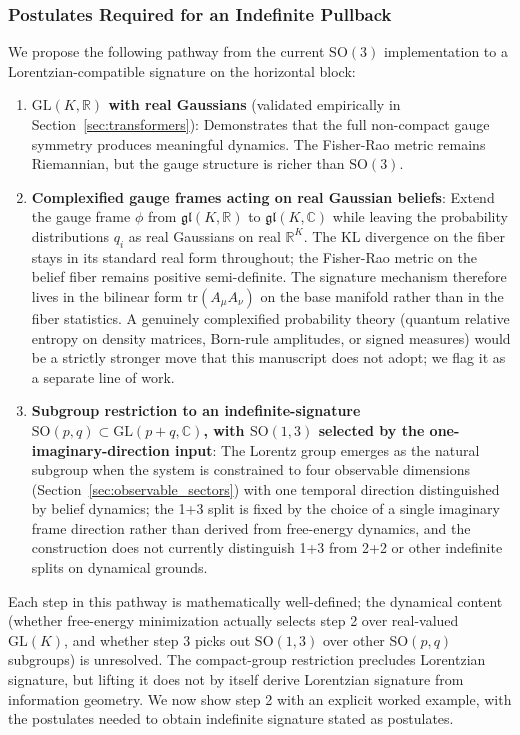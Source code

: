 \documentclass[11pt]{article}
\begin{document}
\subsubsection{Postulates Required for an Indefinite Pullback}

We propose the following pathway from the current $\mathrm{SO}(3)$ implementation to a Lorentzian-compatible signature on the horizontal block:

\begin{enumerate}
\item \textbf{$\mathrm{GL}(K, \mathbb{R})$ with real Gaussians} (validated empirically in Section~\ref{sec:transformers}): Demonstrates that the full non-compact gauge symmetry produces meaningful dynamics. The Fisher-Rao metric remains Riemannian, but the gauge structure is richer than $\mathrm{SO}(3)$.

\item \textbf{Complexified gauge frames acting on real Gaussian beliefs}: Extend the gauge frame $\phi$ from $\mathfrak{gl}(K, \mathbb{R})$ to $\mathfrak{gl}(K, \mathbb{C})$ while leaving the probability distributions $q_i$ as real Gaussians on real $\mathbb{R}^K$. The KL divergence on the fiber stays in its standard real form throughout; the Fisher-Rao metric on the belief fiber remains positive semi-definite. The signature mechanism therefore lives in the bilinear form $\mathrm{tr}(A_\mu A_\nu)$ on the base manifold rather than in the fiber statistics. A genuinely complexified probability theory (quantum relative entropy on density matrices, Born-rule amplitudes, or signed measures) would be a strictly stronger move that this manuscript does not adopt; we flag it as a separate line of work.

\item \textbf{Subgroup restriction to an indefinite-signature $\mathrm{SO}(p,q) \subset \mathrm{GL}(p{+}q, \mathbb{C})$, with $\mathrm{SO}(1,3)$ selected by the one-imaginary-direction input}: The Lorentz group emerges as the natural subgroup when the system is constrained to four observable dimensions (Section~\ref{sec:observable_sectors}) with one temporal direction distinguished by belief dynamics; the 1+3 split is fixed by the choice of a single imaginary frame direction rather than derived from free-energy dynamics, and the construction does not currently distinguish 1+3 from 2+2 or other indefinite splits on dynamical grounds.
\end{enumerate}

Each step in this pathway is mathematically well-defined; the dynamical content (whether free-energy minimization actually selects step 2 over real-valued $\mathrm{GL}(K)$, and whether step 3 picks out $\mathrm{SO}(1,3)$ over other $\mathrm{SO}(p,q)$ subgroups) is unresolved. The compact-group restriction precludes Lorentzian signature, but lifting it does not by itself derive Lorentzian signature from information geometry. We now show step 2 with an explicit worked example, with the postulates needed to obtain indefinite signature stated as postulates.
\end{document}
